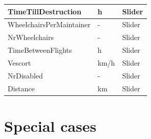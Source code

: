 \documentclass[a4paper, 11pt, notitlepage]{report}
\begin{document}
\begin{table}[h]
\begin{tabular}{|l|l|l|}
TimeTillDestruction      & h        & Slider                                                             \\ \hline
WheelchairsPerMaintainer & -        & Slider                                                             \\ \hline
NrWheelchairs            & -        & Slider                                                             \\ \hline
TimeBetweenFlights       & h        & Slider                                                             \\ \hline
Vescort                  & km/h     & Slider                                                             \\ \hline
NrDisabled               & -        & Slider                                                             \\ \hline
Distance                 & km       & Slider                                                             \\ \hline
\end{tabular}
\end{table}
\chapter{Special cases}
\end{document}

